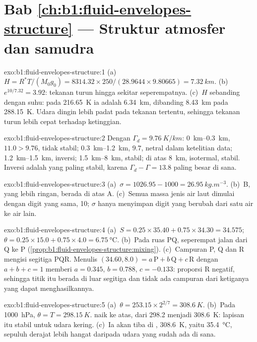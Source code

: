 \section*{Bab \ref{ch:b1:fluid-envelopes-structure} --- Struktur atmosfer dan samudra}

\begin{solution}{exo:b1:fluid-envelopes-structure:1}
(a)~$H = R^*T/(M_0 g_0) = 8314.32 \times 250/(28.9644 \times 9.80665) =
\qty{7.32}{km}$. (b)~$e^{10/7.32} = 3.92$: tekanan turun hingga sekitar seperempatnya.
(c)~$H$ sebanding dengan suhu: pada \qty{216.65}{K} ia adalah
\qty{6.34}{km}, dibanding \qty{8.43}{km} pada \qty{288.15}{K}. Udara dingin lebih padat
pada tekanan tertentu, sehingga tekanan turun lebih cepat terhadap ketinggian.
\end{solution}

\begin{solution}{exo:b1:fluid-envelopes-structure:2}
Dengan $\Gamma_d = \qty{9.76}{K/km}$: \qtyrange{0}{0.3}{km}, $11.0 > 9.76$,
tidak stabil; \qtyrange{0.3}{1.2}{km}, $9.7$, netral dalam ketelitian data;
\qtyrange{1.2}{1.5}{km}, inversi; \qtyrange{1.5}{8}{km}, stabil;
di atas \qty{8}{km}, isotermal, stabil. Inversi adalah yang paling stabil, karena
$\Gamma_d - \Gamma = 13.8$ paling besar di sana.
\end{solution}

\begin{solution}{exo:b1:fluid-envelopes-structure:3}
(a)~$\sigma = 1026.95 - 1000 = \qty{26.95}{kg.m^{-3}}$. (b)~B, yang lebih ringan, berada
di atas A. (c)~Semua massa jenis air laut dimulai dengan digit yang sama, 10; $\sigma$ hanya
menyimpan digit yang berubah dari satu air ke air lain.
\end{solution}

\begin{solution}{exo:b1:fluid-envelopes-structure:4}
(a)~$S = 0.25 \times 35.40 + 0.75 \times 34.30 = 34.575$; $\theta = 0.25 \times
15.0 + 0.75 \times 4.0 = \qty{6.75}{\celsius}$. (b)~Pada ruas PQ, seperempat jalan dari
Q ke P (\cref{prop:b1:fluid-envelopes-structure:mixing}).
(c)~Campuran P, Q dan R mengisi segitiga PQR. Menulis
$(34.60, 8.0) = a\,\mathrm P + b\,\mathrm Q + c\,\mathrm R$ dengan $a + b + c = 1$
memberi $a = 0.345$, $b = 0.788$, $c = -0.133$: proporsi R negatif, sehingga titik itu
berada di luar segitiga dan tidak ada campuran dari ketiganya yang dapat menghasilkannya.
\end{solution}

\begin{solution}{exo:b1:fluid-envelopes-structure:5}
(a)~$\theta = 253.15 \times 2^{2/7} = \qty{308.6}{K}$. (b)~Pada \qty{1000}{hPa},
$\theta = T = \qty{298.15}{K}$.  naik ke atas, dari 298.2 menjadi
\qty{308.6}{K}: lapisan itu stabil untuk udara kering. (c)~Ia akan tiba di
, \qty{308.6}{K}, yaitu \qty{35.4}{\celsius}, sepuluh derajat lebih hangat daripada udara yang sudah ada di sana.
\end{solution}

